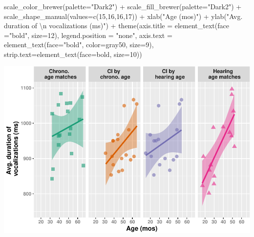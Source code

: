 \documentclass[
]{article}
\newenvironment{Shaded}{\begin{snugshade}}{\end{snugshade}}
\newcommand{\AttributeTok}[1]{\textcolor[rgb]{0.77,0.63,0.00}{#1}}
\newcommand{\DecValTok}[1]{\textcolor[rgb]{0.00,0.00,0.81}{#1}}
\newcommand{\FunctionTok}[1]{\textcolor[rgb]{0.00,0.00,0.00}{#1}}
\newcommand{\NormalTok}[1]{#1}
\newcommand{\SpecialCharTok}[1]{\textcolor[rgb]{0.00,0.00,0.00}{#1}}
\newcommand{\StringTok}[1]{\textcolor[rgb]{0.31,0.60,0.02}{#1}}
\begin{document}
\begin{Shaded}
\begin{Highlighting}[]
  \FunctionTok{scale\_color\_brewer}\NormalTok{(}\AttributeTok{palette=}\StringTok{"Dark2"}\NormalTok{) }\SpecialCharTok{+}
  \FunctionTok{scale\_fill\_brewer}\NormalTok{(}\AttributeTok{palette=}\StringTok{"Dark2"}\NormalTok{) }\SpecialCharTok{+}
  \FunctionTok{scale\_shape\_manual}\NormalTok{(}\AttributeTok{values=}\FunctionTok{c}\NormalTok{(}\DecValTok{15}\NormalTok{,}\DecValTok{16}\NormalTok{,}\DecValTok{16}\NormalTok{,}\DecValTok{17}\NormalTok{)) }\SpecialCharTok{+}
  \FunctionTok{xlab}\NormalTok{(}\StringTok{"Age (mos)"}\NormalTok{) }\SpecialCharTok{+}
  \FunctionTok{ylab}\NormalTok{(}\StringTok{"Avg. duration of }\SpecialCharTok{\textbackslash{}n}\StringTok{ vocalizations (ms)"}\NormalTok{) }\SpecialCharTok{+} 
  \FunctionTok{theme}\NormalTok{(}\AttributeTok{axis.title =} \FunctionTok{element\_text}\NormalTok{(}\AttributeTok{face =}\StringTok{"bold"}\NormalTok{, }\AttributeTok{size=}\DecValTok{12}\NormalTok{),}
        \AttributeTok{legend.position =} \StringTok{"none"}\NormalTok{, }
        \AttributeTok{axis.text =} \FunctionTok{element\_text}\NormalTok{(}\AttributeTok{face=}\StringTok{"bold"}\NormalTok{, }\AttributeTok{color=}\StringTok{\textquotesingle{}gray50\textquotesingle{}}\NormalTok{, }\AttributeTok{size=}\DecValTok{9}\NormalTok{),}
        \AttributeTok{strip.text=}\FunctionTok{element\_text}\NormalTok{(}\AttributeTok{face=}\StringTok{\textquotesingle{}bold\textquotesingle{}}\NormalTok{, }\AttributeTok{size=}\DecValTok{10}\NormalTok{))}
\end{Highlighting}
\end{Shaded}

\includegraphics{everyday_CI_files/figure-latex/visualize age and voc duration continuously-1.pdf}
\end{document}
